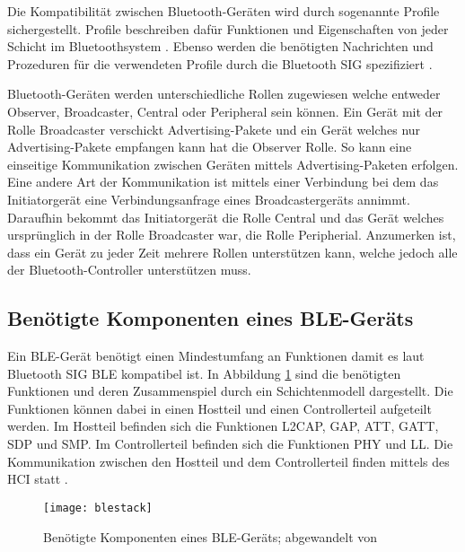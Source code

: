 Die Kompatibilität zwischen Bluetooth-Geräten wird durch sogenannte Profile sichergestellt. Profile beschreiben dafür Funktionen und Eigenschaften von jeder Schicht im Bluetoothsystem \cite[S.~277]{bluetoothCore}. Ebenso werden die benötigten Nachrichten und Prozeduren für die verwendeten Profile durch die Bluetooth \ac{SIG} spezifiziert \cite[S.~1241]{bluetoothCore}.

Bluetooth-Geräten werden unterschiedliche Rollen zugewiesen welche entweder Observer, Broadcaster, Central oder Peripheral sein können. Ein Gerät mit der Rolle Broadcaster verschickt Advertising-Pakete und ein Gerät welches nur Advertising-Pakete empfangen kann hat die Observer Rolle. So kann eine einseitige Kommunikation zwischen Geräten mittels Advertising-Paketen erfolgen. Eine andere Art der Kommunikation ist mittels einer Verbindung bei dem das Initiatorgerät eine Verbindungsanfrage eines Broadcastergeräts annimmt. Daraufhin bekommt das Initiatorgerät die Rolle Central und das Gerät welches ursprünglich in der Rolle Broadcaster war, die Rolle Peripherial. Anzumerken ist, dass ein Gerät zu jeder Zeit mehrere Rollen unterstützen kann, welche jedoch alle der Bluetooth-Controller unterstützen muss. \cite[S.~190f., S.~278, S.~1246ff.]{bluetoothCore}

\subsection{Benötigte Komponenten eines \ac{BLE}-Geräts}

Ein \ac{BLE}-Gerät benötigt einen Mindestumfang an Funktionen damit es laut Bluetooth \ac{SIG} \ac{BLE} kompatibel ist. In Abbildung \ref{fig:blestack} sind die benötigten Funktionen und deren Zusammenspiel durch ein Schichtenmodell dargestellt. Die Funktionen können dabei in einen Hostteil und einen Controllerteil aufgeteilt werden. Im Hostteil befinden sich die Funktionen \ac{L2CAP}, \ac{GAP}, \ac{ATT}, \ac{GATT}, \ac{SDP} und \ac{SMP}. Im Controllerteil befinden sich die Funktionen \ac{PHY} und \ac{LL}. Die Kommunikation zwischen den Hostteil und dem Controllerteil finden mittels des \ac{HCI} statt \cite[S.~1735]{bluetoothCore}. \cite[S.~193]{bluetoothCore}

\begin{figure}[h]
    \centering
    \texttt{[image: blestack]}
    \caption{Benötigte Komponenten eines \acs{BLE}-Geräts; abgewandelt von \cite[S.~203, S.~1245]{bluetoothCore}}
    \label{fig:blestack}
\end{figure}

